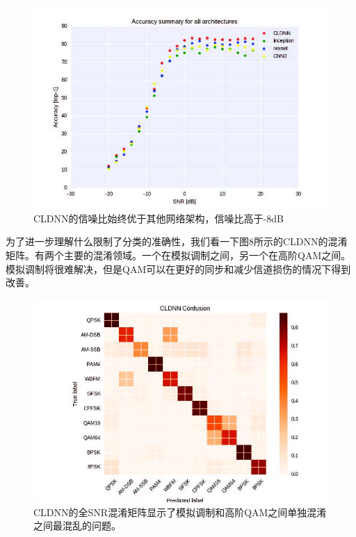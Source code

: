 \begin{figure}[!h]
	\centering
	\includegraphics[scale=1]{figures/chapter_5/fig7}
	\caption{CLDNN的信噪比始终优于其他网络架构，信噪比高于-8dB}
\end{figure}

为了进一步理解什么限制了分类的准确性，我们看一下图8所示的CLDNN的混淆矩阵。有两个主要的混淆领域。一个在模拟调制之间，另一个在高阶QAM之间。模拟调制将很难解决，但是QAM可以在更好的同步和减少信道损伤的情况下得到改善。\par

\begin{figure}[!h]
	\centering
	\includegraphics[scale=1]{figures/chapter_5/fig8}
	\caption{CLDNN的全SNR混淆矩阵显示了模拟调制和高阶QAM之间单独混淆之间最混乱的问题。}
\end{figure}

